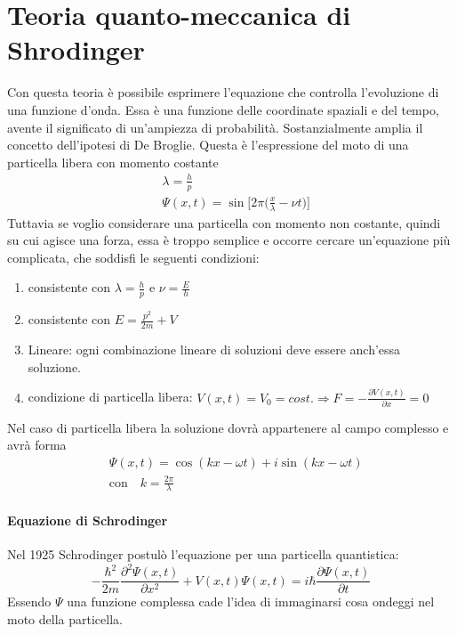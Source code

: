 
\section{Teoria quanto-meccanica di Shrodinger}
Con questa teoria è possibile esprimere l'equazione che controlla l'evoluzione di una funzione d'onda.
Essa è una funzione delle coordinate spaziali e del tempo, avente il significato di un'ampiezza di probabilità.
Sostanzialmente amplia il concetto dell'ipotesi di De Broglie.
Questa è l'espressione del moto di una particella libera con momento costante
\begin{equation}
\begin{split}
& \lambda = \frac{ h}{p } \\
& \Psi(x,t) = \sin \biggl[ 2 \pi \biggl( \frac{x}{\lambda} - \nu t \biggr) \biggr]
\end{split}
\end{equation}
Tuttavia se voglio considerare una particella con momento non costante, quindi su cui agisce una forza, essa è troppo semplice e occorre cercare un'equazione più complicata, che soddisfi le seguenti condizioni:
\begin{enumerate}
\item consistente con $\lambda = \frac{ h}{p }$ e $\nu = \frac{ E}{ h}$
\item consistente con $E = \frac{p^2}{2m} + V$
\item Lineare: ogni combinazione lineare di soluzioni deve essere anch'essa soluzione.
\item condizione di particella libera: $V(x,t) = V_0 = cost. \Rightarrow F=-\frac{ \partial V(x,t)}{ \partial x} = 0$
\end{enumerate}
Nel caso di particella libera la soluzione dovrà appartenere al campo complesso e avrà forma
\begin{equation}
\begin{split}
& \Psi (x,t) = \cos(kx-\omega t) + i \sin(kx - \omega t) \\
& \mbox{con} \quad k = \frac{2\pi}{\lambda}
\end{split}
\end{equation}


\paragraph{Equazione di Schrodinger} Nel 1925 Schrodinger postulò l'equazione per una particella quantistica:
\begin{equation}
- \frac{\hbar^2}{2m} \frac{\partial^2 \Psi(x,t)}{\partial x^2} + V(x,t) \Psi(x,t) = i \hbar \frac{\partial \Psi(x,t)}{\partial t}
\label{eq_schrodinger}
\end{equation}
Essendo $\Psi$ una funzione complessa cade l'idea di immaginarsi cosa ondeggi nel moto della particella.


